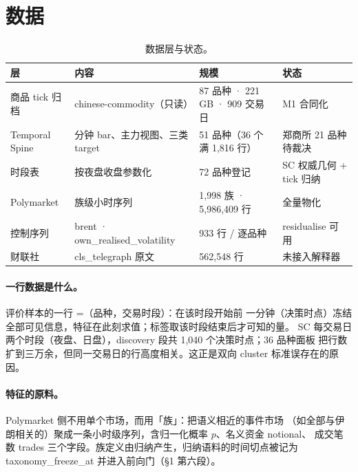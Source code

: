 \documentclass[11pt]{ctexart}
\begin{document}
\section{数据}
\begin{table}[htbp]\centering\footnotesize
\begin{tabular}{@{}l p{} p{} l@{}}\toprule
层 & 内容 & 规模 & 状态 \\ \midrule
商品 tick 归档 & chinese-commodity（只读） & 87 品种 · 221 GB · 909 交易日 & M1 合同化 \\
Temporal Spine & 分钟 bar、主力视图、三类 target & 51 品种（36 个满 1{,}816 行） & 郑商所 21 品种待裁决 \\
时段表 & 按夜盘收盘参数化 & 72 品种登记 & SC 权威几何 + tick 归纳 \\
Polymarket & 族级小时序列 & 1{,}998 族 · 5{,}986{,}409 行 & 全量物化 \\
控制序列 & brent · own\_realised\_volatility & 933 行 / 逐品种 & residualise 可用 \\
财联社 & cls\_telegraph 原文 & 562{,}548 行 & \textcolor{bad}{未接入解释器} \\
\bottomrule\end{tabular}
\caption{数据层与状态。}\end{table}

\paragraph{一行数据是什么。}评价样本的一行 =（品种，交易时段）：在该时段开始前
一分钟（决策时点）冻结全部可见信息，特征在此刻求值；标签取该时段结束后才可知的量。
SC 每交易日两个时段（夜盘、日盘），discovery 段共 1{,}040 个决策时点；36 品种面板
把行数扩到三万余，但同一交易日的行高度相关。这正是双向 cluster 标准误存在的原因。

\paragraph{特征的原料。}Polymarket 侧不用单个市场，而用「族」：把语义相近的事件市场
（如全部与伊朗相关的）聚成一条小时级序列，含归一化概率 $p$、名义资金 notional、
成交笔数 trades 三个字段。族定义由归纳产生，归纳语料的时间切点被记为
taxonomy\_freeze\_at 并进入前向门（\S1 第六段）。
\end{document}
